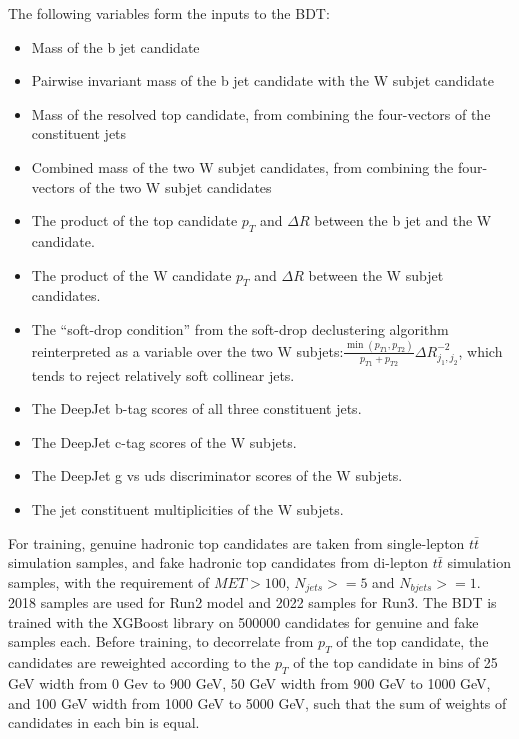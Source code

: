 \documentclass[twoside]{article}
\begin{document}
The following variables form the inputs to the BDT:

\begin{itemize}
  \item Mass of the b jet candidate
  \item Pairwise invariant mass of the b jet candidate with the W subjet candidate
  \item Mass of the resolved top candidate, from combining the four-vectors of the constituent jets
  \item Combined mass of the two W subjet candidates, from combining the four-vectors of the two W subjet candidates
  \item The product of the top candidate $p_{T}$ and $\Delta R$ between the b jet and the W candidate.
  \item The product of the W candidate $p_{T}$ and $\Delta R$ between the W subjet candidates.
  \item The ``soft-drop condition'' from the soft-drop declustering algorithm reinterpreted as a variable over the two W subjets:$\frac{\min(p_{T1}, p_{T2})}{p_{T1} + p_{T2}} \Delta R_{j_1, j_2}^{-2}$, which tends to reject relatively soft collinear jets.
  \item The DeepJet b-tag scores of all three constituent jets.
  \item The DeepJet c-tag scores of the W subjets. %
  \item The DeepJet g vs uds discriminator scores of the W subjets.
  \item The jet constituent multiplicities of the W subjets.
\end{itemize}

For training, genuine hadronic top candidates are taken from single-lepton $t\bar{t}$ simulation samples, and fake hadronic top candidates from di-lepton $t\bar{t}$ simulation samples, with the requirement of $MET>100$,  $N_{jets}>=5$ and $N_{bjets}>=1$. 2018 samples are used for Run2 model and 2022 samples for Run3. The BDT is trained with the XGBoost library on 500000 candidates for genuine and fake samples each. Before training, to decorrelate from $p_{T}$ of the top candidate, the candidates are reweighted according to the $p_{T}$ of the top candidate in bins of 25 GeV width from 0 Gev to 900 GeV, 50 GeV width from 900 GeV to 1000 GeV, and 100 GeV width from 1000 GeV to 5000 GeV, such that the sum of weights of candidates in each bin is equal. \\
\end{document}
